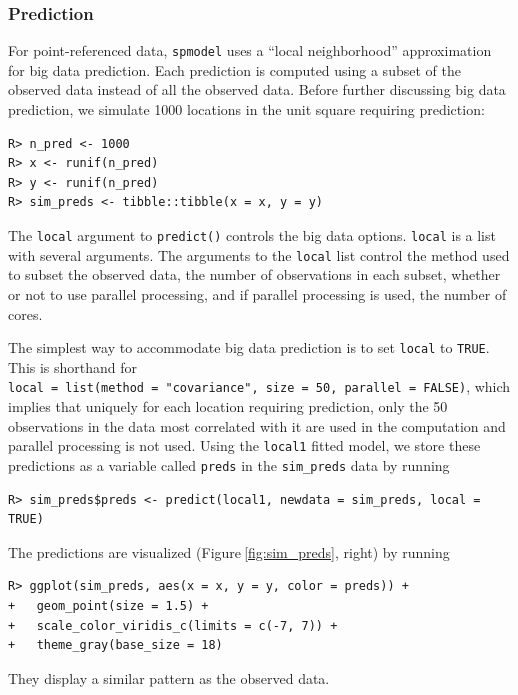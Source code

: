 \documentclass{article}
\begin{document}
\hypertarget{sec:predict}{%
\subsubsection{Prediction}\label{sec:predict}}

For point-referenced data, \texttt{spmodel} uses a ``local
neighborhood'' approximation for big data prediction. Each prediction is
computed using a subset of the observed data instead of all the observed
data. Before further discussing big data prediction, we simulate 1000
locations in the unit square requiring prediction:

\begin{verbatim}
R> n_pred <- 1000
R> x <- runif(n_pred)
R> y <- runif(n_pred)
R> sim_preds <- tibble::tibble(x = x, y = y)
\end{verbatim}

The \texttt{local} argument to \texttt{predict()} controls the big data
options. \texttt{local} is a list with several arguments. The arguments
to the \texttt{local} list control the method used to subset the
observed data, the number of observations in each subset, whether or not
to use parallel processing, and if parallel processing is used, the
number of cores.

The simplest way to accommodate big data prediction is to set
\texttt{local} to \texttt{TRUE}. This is shorthand for
\texttt{local\ =\ list(method\ =\ "covariance",\ size\ =\ 50,\ parallel\ =\ FALSE)},
which implies that uniquely for each location requiring prediction, only
the 50 observations in the data most correlated with it are used in the
computation and parallel processing is not used. Using the
\texttt{local1} fitted model, we store these predictions as a variable
called \texttt{preds} in the \texttt{sim\_preds} data by running

\begin{verbatim}
R> sim_preds$preds <- predict(local1, newdata = sim_preds, local = TRUE)
\end{verbatim}

The predictions are visualized (Figure\(~\)\ref{fig:sim_preds}, right)
by running

\begin{verbatim}
R> ggplot(sim_preds, aes(x = x, y = y, color = preds)) +
+   geom_point(size = 1.5) +
+   scale_color_viridis_c(limits = c(-7, 7)) + 
+   theme_gray(base_size = 18)
\end{verbatim}

They display a similar pattern as the observed data.
\end{document}
